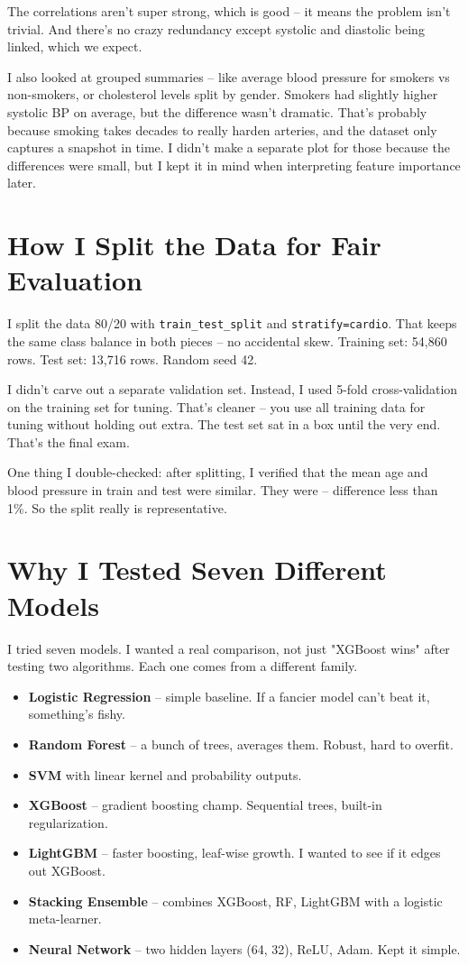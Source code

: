 \documentclass[12pt, a4paper, oneside]{book}
\begin{document}
The correlations aren't super strong, which is good – it means the problem isn't trivial. And there's no crazy redundancy except systolic and diastolic being linked, which we expect.

I also looked at grouped summaries – like average blood pressure for smokers vs non-smokers, or cholesterol levels split by gender. Smokers had slightly higher systolic BP on average, but the difference wasn't dramatic. That's probably because smoking takes decades to really harden arteries, and the dataset only captures a snapshot in time. I didn't make a separate plot for those because the differences were small, but I kept it in mind when interpreting feature importance later.

\section{How I Split the Data for Fair Evaluation}
I split the data 80/20 with \texttt{train\_test\_split} and \texttt{stratify=cardio}. That keeps the same class balance in both pieces -- no accidental skew. Training set: 54,860 rows. Test set: 13,716 rows. Random seed 42.

I didn't carve out a separate validation set. Instead, I used 5-fold cross-validation on the training set for tuning. That's cleaner – you use all training data for tuning without holding out extra. The test set sat in a box until the very end. That's the final exam.

One thing I double-checked: after splitting, I verified that the mean age and blood pressure in train and test were similar. They were – difference less than 1\%. So the split really is representative.

\section{Why I Tested Seven Different Models}
I tried seven models. I wanted a real comparison, not just "XGBoost wins" after testing two algorithms. Each one comes from a different family.

\begin{itemize}
  \item \textbf{Logistic Regression} – simple baseline. If a fancier model can't beat it, something's fishy.
  \item \textbf{Random Forest} – a bunch of trees, averages them. Robust, hard to overfit.
  \item \textbf{SVM} with linear kernel and probability outputs.
  \item \textbf{XGBoost} – gradient boosting champ. Sequential trees, built-in regularization.
  \item \textbf{LightGBM} – faster boosting, leaf-wise growth. I wanted to see if it edges out XGBoost.
  \item \textbf{Stacking Ensemble} – combines XGBoost, RF, LightGBM with a logistic meta-learner.
  \item \textbf{Neural Network} – two hidden layers (64, 32), ReLU, Adam. Kept it simple.
\end{itemize}
\end{document}

